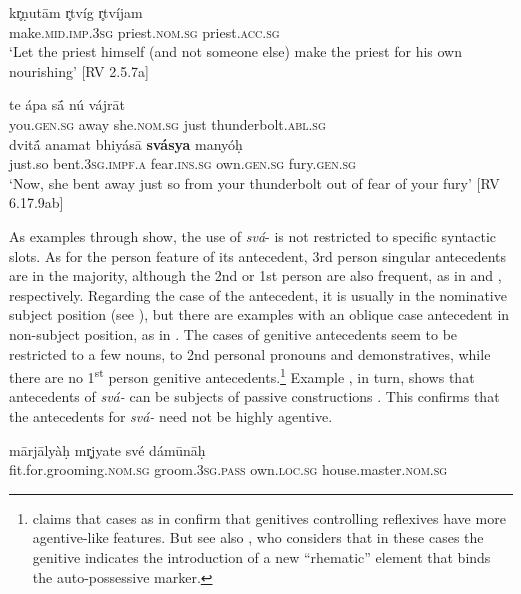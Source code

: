 \documentclass[output=paper]{langscibook}
\begin{document}
      \gll kr̥ṇutām  r̥tvíg  r̥tvíjam\\
      make.\textsc{mid.imp.3sg}  priest.\textsc{nom.sg}     priest.\textsc{acc.sg}\\
\glt ‘Let the priest himself (and not someone else) make the priest for his own nourishing’ [RV 2.5.7a]
\z
\z

\ea%
    \label{ex:Orqueda:25}
 te  ápa       s\'{ā}  nú        vájrāt\\
  { } you.\textsc{gen.sg}    away  she.\textsc{nom.sg}   just  thunderbolt.\textsc{abl.sg}\\

\gll dvit\'{ā}  anamat  bhiyásā \textbf{svásya} manyóḥ\\
  just.so  bent.\textsc{3sg.impf.a}  fear.\textsc{ins.sg}  own.\textsc{gen.sg}  fury.\textsc{gen.sg}\\
\glt ‘Now, she bent away just so from your thunderbolt out of fear of your fury’ [RV 6.17.9ab]
\z

{As examples  through  show, the use of \textit{svá}{}- is not restricted to specific syntactic slots. As for the person feature of its antecedent, 3rd person singular antecedents are in the majority, although the 2nd or 1st person are also frequent, as in  and , respectively. Regarding the case of the antecedent, it is usually in the nominative subject position (see \citealt{Vine1997}), but there are examples with an oblique case antecedent in non-subject position, as in . The cases of genitive antecedents seem to be restricted to a few nouns, to 2nd personal pronouns and demonstratives, while there are no 1\textsuperscript{st} person genitive antecedents.}\footnote{{{\citet{Hock1991} claims that cases as in  confirm that genitives controlling reflexives have more agentive-like features. But see also \citet[212-213]{Vine1997}, who considers that in these cases the genitive indicates the introduction of a new “rhematic” element that binds the auto-possessive marker.}}} Example , in turn, shows that antecedents of \textit{svá-} can be subjects of passive constructions \citep{GrestenbergerNoDate}. This confirms that the antecedents for \textit{svá-} need not be highly agentive.

\ea
\label{ex:Orqueda:26}
\gll mārjālyàḥ  mr̥jyate  své  dámūnāḥ\\
   fit.for.grooming.\textsc{nom.sg}  groom.\textsc{3sg.pass}  own.\textsc{loc.sg}  house.master.\textsc{nom.sg}\\
\end{document}

